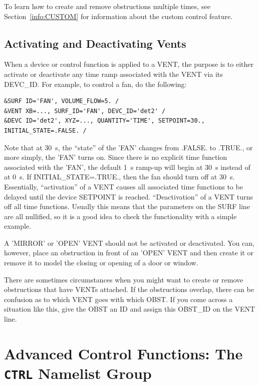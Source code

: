 \documentclass[11pt]{book}
\begin{document}
To learn how to create and remove obstructions multiple times, see Section~\ref{info:CUSTOM} for information about the custom control feature.



\subsection{Activating and Deactivating Vents}
\label{info:activate_deactivate}

When a device or control function is applied to a {\ct VENT}, the purpose is to either activate or deactivate any time ramp associated with the {\ct VENT} via its {\ct DEVC\_ID}. For example, to control a fan, do the following:
\begin{lstlisting}
&SURF ID='FAN', VOLUME_FLOW=5. /
&VENT XB=..., SURF_ID='FAN', DEVC_ID='det2' /
&DEVC ID='det2', XYZ=..., QUANTITY='TIME', SETPOINT=30., INITIAL_STATE=.FALSE. /
\end{lstlisting}
Note that at 30~s, the ``state'' of the {\ct 'FAN'} changes from {\ct .FALSE.} to {\ct .TRUE.}, or more simply, the {\ct 'FAN'} turns on. Since there is no explicit time function associated with the {\ct 'FAN'}, the default 1~s ramp-up will begin at 30~s instead of at 0~s. If {\ct INITIAL\_STATE=.TRUE.}, then the fan should turn off at 30~s. Essentially, ``activation'' of a {\ct VENT} causes all associated time functions to be delayed until the device {\ct SETPOINT} is reached. ``Deactivation'' of a {\ct VENT} turns off all time functions. Usually this means that the parameters on the {\ct SURF} line are all nullified, so it is a good idea to check the functionality with a simple example.

A {\ct 'MIRROR'} or {\ct 'OPEN'} {\ct VENT} should not be activated or deactivated. You can, however, place an obstruction in front of an {\ct 'OPEN'} {\ct VENT} and then create it or remove it to model the closing or opening of a door or window.

There are sometimes circumstances when you might want to create or remove obstructions that have {\ct VENT}s attached. If the obstructions overlap, there can be confusion as to which {\ct VENT} goes with which {\ct OBST}. If you come across a situation like this, give the {\ct OBST} an {\ct ID} and assign this {\ct OBST\_ID} on the {\ct VENT} line.



\section{Advanced Control Functions: The \texorpdfstring{{\tt CTRL}}{CTRL} Namelist Group}
\label{info:CTRL}
\end{document}
